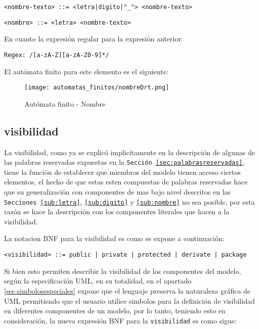 \begin{lstlisting}[basicstyle=\footnotesize\ttfamily]
  <nombre-texto> ::= <letra|digito|"_"> <nombre-texto>
\end{lstlisting}

\begin{lstlisting}[basicstyle=\footnotesize\ttfamily]
  <nombre> ::= <letra> <nombre-texto>
\end{lstlisting}

En cuanto la expresión regular para la expresión anterior:

\begin{lstlisting}[basicstyle=\footnotesize\ttfamily]
	Regex: /[a-zA-Z][a-zA-Z0-9]*/
\end{lstlisting}

El autómata finito para este elemento es el siguiente:

\begin{figure}[H]
	\centering
	\texttt{[image: automatas\_finitos/nombreDrt.png]}
	\caption{Autómata finito - Nombre}
	\label{fig:nombre}
\end{figure}

\subsection{visibilidad}
\label{sub:visibilidad}
La visibilidad, como ya se explicó implicitamente en la descripción de algunas
de las palabras reservadas expuestas en la \texttt{Sección
\ref{sec:palabrasreservadas}}, tiene la función de establecer que miembros del
modelo tienen acceso ciertos elementos, el hecho de que estas esten compuestas
de palabras reservadas hace que su generalización con componentes de mas bajo
nivel descritos en las \texttt{Secciones \ref{sub:letra}},
\texttt{\ref{sub:digito}} y \texttt{\ref{sub:nombre}} no sea posible, por esta
razón se hace la descripción con los componentes literales que hacen a la
visibilidad.

La notacion BNF para la visibilidad es como se expone a continuación:

\begin{lstlisting}[basicstyle=\footnotesize\ttfamily]
  <visibilidad> ::= public | private | protected | derivate | package
\end{lstlisting}

Si bien esto permiten describir la visibilidad de los componentes del modelo,
según la especificación UML, en su totalidad, en el apartado
\ref{sec:simbolosespeciales} expone que el lenguaje preserva la naturaleza
gráfica de UML permitiendo que el usuario utilice simbolos para la definición
de visibilidad en diferentes componentes de un modelo, por lo tanto, teniendo
esto en consideración, la nueva expresión BNF para la \texttt{visibilidad} es
como sigue:

